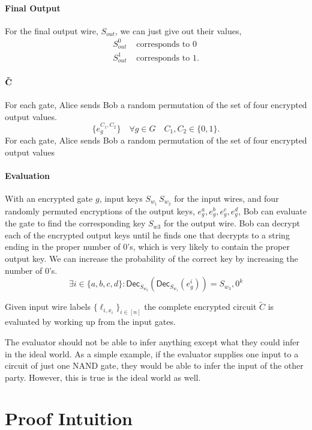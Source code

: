 \documentclass[12pt]{tufte-book}
\newcommand{\Dec}{\mathsf{Dec}}
\begin{document}
\paragraph{Final Output}
For the final output wire, $S_{out}$, we can just give out their values,
\begin{align*}
S_{out}^0 &\text{ corresponds to 0}\\
S_{out}^1 &\text{ corresponds to 1.}
\end{align*}

\paragraph{$\bold{\tilde{C}}$}
For each gate, Alice sends Bob a random permutation of the set of four encrypted output values.
\[
\{e_g^{C_1, C_2} \} \quad \forall g \in G \quad C_1, C_2 \in \{0,1\}.
\]
For each gate, Alice sends Bob a random permutation of the set of four encrypted output values

\paragraph{Evaluation}
With an encrypted gate $g$,
input keys $S_{w_1} \, S_{w_2}$ for the input wires,
and four randomly permuted encryptions of the output keys, $e_g^{a}, e_g^{b}, e_g^{c}, e_g^{d}$,
Bob can evaluate the gate to find the corresponding key $S_{w3}$ for the output wire.
Bob can decrypt each of the encrypted output keys until he finds one that decrypts 
to a string ending in the proper number of $0$'s, which is very likely to contain the proper output key.
We can increase the probability of the correct key by increasing the number of $0$'s. 
\[
\exists  i \in \{a, b, c, d\} : \Dec_{S_{w_2}} ( \Dec_{S_{w_1}} ( e_g^{i} ))  = S_{w_3}, 0^k
\]

Given input wire labels 
$\{ \ell_{i, x_i} \}_{i \in [n]}$
the complete encrypted circuit $\tilde{C}$ is evaluated by working up from the input gates. 






The evaluator should not be able to infer anything except what they could infer in the ideal world.
As a simple example, if the evaluator supplies one input to a circuit of just one NAND gate,
 they would be able to infer the input of the other party. However, this is true is the ideal world as well.

\section{Proof Intuition}
\end{document}
